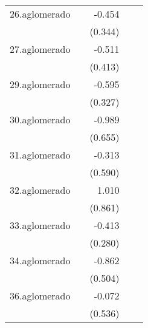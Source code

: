 {\begin{longtable}{l*{4}{D{.}{.}{-1}}}
\addlinespace
26.aglomerado&                     &      -0.454         &                     &                     \\
            &                     &     (0.344)         &                     &                     \\
\addlinespace
27.aglomerado&                     &      -0.511         &                     &                     \\
            &                     &     (0.413)         &                     &                     \\
\addlinespace
29.aglomerado&                     &      -0.595         &                     &                     \\
            &                     &     (0.327)         &                     &                     \\
\addlinespace
30.aglomerado&                     &      -0.989         &                     &                     \\
            &                     &     (0.655)         &                     &                     \\
\addlinespace
31.aglomerado&                     &      -0.313         &                     &                     \\
            &                     &     (0.590)         &                     &                     \\
\addlinespace
32.aglomerado&                     &       1.010         &                     &                     \\
            &                     &     (0.861)         &                     &                     \\
\addlinespace
33.aglomerado&                     &      -0.413         &                     &                     \\
            &                     &     (0.280)         &                     &                     \\
\addlinespace
34.aglomerado&                     &      -0.862         &                     &                     \\
            &                     &     (0.504)         &                     &                     \\
\addlinespace
36.aglomerado&                     &      -0.072         &                     &                     \\
            &                     &     (0.536)         &                     &                     \\

\end{longtable}}
